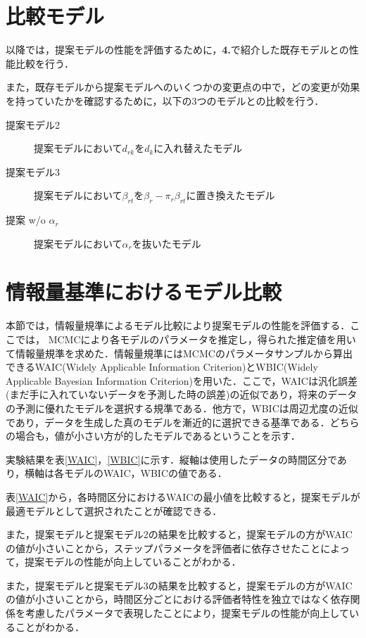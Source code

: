 \documentclass[a4paper,11pt,oneside,openany]{jsbook}
\begin{document}
\newpage
\section{比較モデル}
以降では，提案モデルの性能を評価するために，\textbf{4.}で紹介した既存モデルとの性能比較を行う．

また，既存モデルから提案モデルへのいくつかの変更点の中で，どの変更が効果を持っていたかを確認するために，以下の3つのモデルとの比較を行う．

\begin{description}
\item [提案モデル2]提案モデルにおいて$d_{rk}$を$d_k$に入れ替えたモデル
\item[提案モデル3]提案モデルにおいて$\beta_{rt}$を$\beta_{r} - \pi_{r}\beta_{rt}$に置き換えたモデル
\item[提案 w/o $\alpha_r$]提案モデルにおいて$\alpha_r$を抜いたモデル
\end{description}

\section{情報量基準におけるモデル比較}

本節では，情報量規準によるモデル比較により提案モデルの性能を評価する．ここでは， MCMCにより各モデルのパラメータを推定し，得られた推定値を用いて情報量規準を求めた．情報量規準にはMCMCのパラメータサンプルから算出できるWAIC(Widely Applicable Information Criterion)とWBIC(Widely Applicable Bayesian Information Criterion)を用いた．ここで，WAICは汎化誤差(まだ手に入れていないデータを予測した時の誤差)の近似であり，将来のデータの予測に優れたモデルを選択する規準である．他方で，WBICは周辺尤度の近似であり，データを生成した真のモデルを漸近的に選択できる基準である．どちらの場合も，値が小さい方が的したモデルであるということを示す．

実験結果を表\ref{WAIC}，\ref{WBIC}に示す．縦軸は使用したデータの時間区分であり，横軸は各モデルのWAIC，WBICの値である．

表\ref{WAIC}から，各時間区分におけるWAICの最小値を比較すると，提案モデルが最適モデルとして選択されたことが確認できる．

また，提案モデルと提案モデル2の結果を比較すると，提案モデルの方がWAICの値が小さいことから，ステップパラメータを評価者に依存させたことによって，提案モデルの性能が向上していることがわかる．

また，提案モデルと提案モデル3の結果を比較すると，提案モデルの方がWAICの値が小さいことから，時間区分ごとにおける評価者特性を独立ではなく依存関係を考慮したパラメータで表現したことにより，提案モデルの性能が向上していることがわかる．
\end{document}
